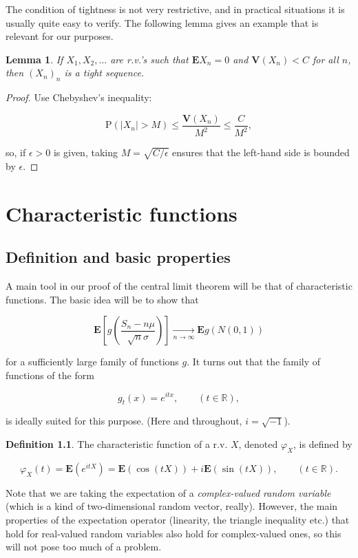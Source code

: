 \documentclass[11pt]{report}
\newcommand{\R}{\mathbb{R}}
\theoremstyle{plain}
\newtheorem{lem}[thm]{Lemma}
\theoremstyle{definition}
\newtheorem{defn}[thm]{Definition}
\begin{document}
\noindent The condition of tightness is not very restrictive,
and in practical situations it is usually quite easy
to verify. The following lemma gives an example that
is relevant for our purposes.

\begin{lem}
If $X_1,X_2,\ldots$ are r.v.'s such that
$\mathbf{E} X_n=0$ and $\mathbf{V}(X_n)<C$ for all
$n$, then $(X_n)_n$ is a tight sequence.
\end{lem}

\begin{proof}
Use Chebyshev's inequality:

\[
\mathrm{P}(|X_n|>M) \le \frac{\mathbf{V}(X_n)}{M^2} \le \frac{C}{M^2},
\]

\noindent so, if $\epsilon>0$ is given, taking
$M=\sqrt{C/\epsilon}$ ensures that the left-hand side
is bounded by $\epsilon$.
\end{proof}

\chapter{Characteristic functions}

\section{Definition and basic properties}

A main tool in our proof of the central limit theorem
will be that of characteristic functions. The basic
idea will be to show that

\[
\mathbf{E}\left[ g\left( \frac{S_n-n\mu}{\sqrt{n}\sigma}\right)\right] \xrightarrow[n\to\infty]{} \mathbf{E} g(N(0,1))
\]

\noindent for a sufficiently large family of functions $g$. It
turns out that the family of functions of the form

\[
g_t(x) = e^{itx}, \qquad (t\in\R),
\]

\noindent is ideally suited for this purpose. (Here and
throughout, $i=\sqrt{-1}$).

\begin{defn}
The characteristic function of a r.v. $X$, denoted
$\varphi_X$, is defined by

\[
\varphi_X(t) = \mathbf{E}\left(e^{i t X}\right) = \mathbf{E}(\cos(t X)) + i \mathbf{E}(\sin(t X)), \qquad (t\in\R).
\]

\end{defn}

\noindent Note that we are taking the expectation of a
\emph{complex-valued random variable} (which is a kind of
two-dimensional random vector, really). However, the
main properties of the expectation operator
(linearity, the triangle inequality etc.) that hold
for real-valued random variables also hold for
complex-valued ones, so this will not pose too much of
a problem.
\end{document}
